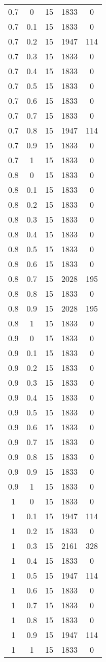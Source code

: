 \begin{longtable}{|c|c|c|c|c|}
	0.7& 0& 15& 1833& 0 \\
	0.7& 0.1& 15& 1833& 0 \\
	0.7& 0.2& 15& 1947& 114 \\
	0.7& 0.3& 15& 1833& 0 \\
	0.7& 0.4& 15& 1833& 0 \\
	0.7& 0.5& 15& 1833& 0 \\
	0.7& 0.6& 15& 1833& 0 \\
	0.7& 0.7& 15& 1833& 0 \\
	0.7& 0.8& 15& 1947& 114 \\
	0.7& 0.9& 15& 1833& 0 \\
	0.7& 1& 15& 1833& 0 \\
	\hline
	
	0.8& 0& 15& 1833& 0 \\
	0.8& 0.1& 15& 1833& 0 \\
	0.8& 0.2& 15& 1833& 0 \\
	0.8& 0.3& 15& 1833& 0 \\
	0.8& 0.4& 15& 1833& 0 \\
	0.8& 0.5& 15& 1833& 0 \\
	0.8& 0.6& 15& 1833& 0 \\
	0.8& 0.7& 15& 2028& 195 \\
	0.8& 0.8& 15& 1833& 0 \\
	0.8& 0.9& 15& 2028& 195 \\
	0.8& 1& 15& 1833& 0 \\
	\hline
	
	0.9& 0& 15& 1833& 0 \\
	0.9& 0.1& 15& 1833& 0 \\
	0.9& 0.2& 15& 1833& 0 \\
	0.9& 0.3& 15& 1833& 0 \\
	0.9& 0.4& 15& 1833& 0 \\
	0.9& 0.5& 15& 1833& 0 \\
	0.9& 0.6& 15& 1833& 0 \\
	0.9& 0.7& 15& 1833& 0 \\
	0.9& 0.8& 15& 1833& 0 \\
	0.9& 0.9& 15& 1833& 0 \\
	0.9& 1& 15& 1833& 0 \\
	\hline
	
	1& 0& 15& 1833& 0 \\
	1& 0.1& 15& 1947& 114 \\
	1& 0.2& 15& 1833& 0 \\
	1& 0.3& 15& 2161& 328 \\
	1& 0.4& 15& 1833& 0 \\
	1& 0.5& 15& 1947& 114 \\
	1& 0.6& 15& 1833& 0 \\
	1& 0.7& 15& 1833& 0 \\
	1& 0.8& 15& 1833& 0 \\
	1& 0.9& 15& 1947& 114 \\
	1& 1& 15& 1833& 0 \\

\end{longtable}

